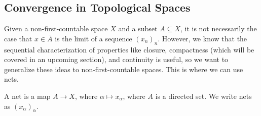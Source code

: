 \subsection{Convergence in Topological Spaces}%
Given a non-first-countable space $X$ and a subset $A\subseteq X$, it is not necessarily the case that $x\in \overline{A}$ is the limit of a sequence $\left(x_n\right)_n$. However, we know that the sequential characterization of properties like closure, compactness (which will be covered in an upcoming section), and continuity is useful, so we want to generalize these ideas to non-first-countable spaces. This is where we can use nets.
\begin{definition}[Nets]
  A net is a map $A\rightarrow X$, where $\alpha \mapsto x_{\alpha}$, where $A$ is a directed set. We write nets as $\left(x_{\alpha}\right)_{\alpha}$.
\end{definition}
